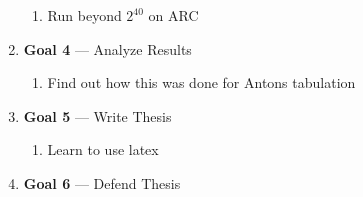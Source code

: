 \documentclass[11pt]{article}
\theoremstyle{definition}
\begin{document}
\begin{enumerate}[leftmargin=\parindent,align=left,labelwidth=\parindent,labelsep=0pt]
\begin{enumerate}
    \item Run beyond $2^{40}$ on ARC 
\end{enumerate}



\item[] \textbf{Goal 4} --- Analyze Results 

\begin{enumerate}
    \item Find out how this was done for Antons tabulation
\end{enumerate}

\item[] \textbf{Goal 5} --- Write Thesis
\begin{enumerate}
    \item Learn to use latex
\end{enumerate}


\item[] \textbf{Goal 6} --- Defend Thesis

\end{enumerate}
\end{document}
